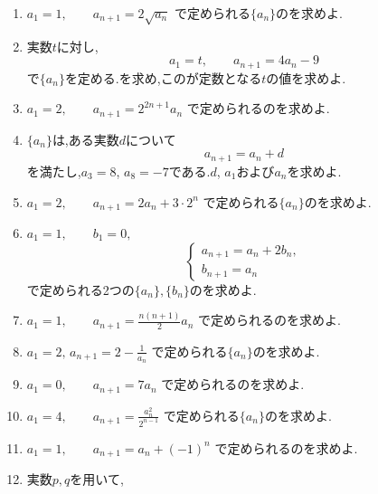\begin{enumerate}[label=\textbf{問\arabic*.},leftmargin=3.8em,format=\bookitemlink{practice-basic}{problem}{hint}]
\[\begin{cases}
        b_{n+1}=a_n+2b_n-1
      \end{cases}
    \]
    で定められる2つの$\{a_n\},\{b_n\}$のを求めよ.
  \item $a_1=1,\qquad a_{n+1}=2\sqrt{a_n}$
    で定められる$\{a_n\}$のを求めよ.
  \item 実数$t$に対し,
    \[
      a_1=t,\qquad a_{n+1}=4a_n-9
    \]
    で$\{a_n\}$を定める.を求め,このが定数となる$t$の値を求めよ.
  \item $a_1=2,\qquad a_{n+1}=2^{2n+1}a_n$
    で定められるのを求めよ.
  \item {}$\{a_n\}$は,ある実数$d$について
    \[
      a_{n+1}=a_n+d
    \]
    を満たし,$a_3=8$, $a_8=-7$である.$d$, $a_1$および$a_n$を求めよ.
  \item $a_1=2,\qquad a_{n+1}=2a_n+3\cdot2^n$
    で定められる$\{a_n\}$のを求めよ.
  \item $a_1=1,\qquad b_1=0,$
    \[
      \begin{cases}
        a_{n+1}=a_n+2b_n,\\
        b_{n+1}=a_n
      \end{cases}
    \]
    で定められる2つの$\{a_n\},\{b_n\}$のを求めよ.
  \item $a_1=1,\qquad a_{n+1}=\frac{n(n+1)}2a_n$
    で定められるのを求めよ.
  \item $a_1=2,\,a_{n+1}=2-\frac1{a_n}$
    で定められる$\{a_n\}$のを求めよ.
  \item $a_1=0,\qquad a_{n+1}=7a_n$
    で定められるのを求めよ.
  \item $a_1=4,\qquad a_{n+1}=\frac{a_n^2}{2^{n-1}}$
    で定められる$\{a_n\}$のを求めよ.
  \item $a_1=1,\qquad a_{n+1}=a_n+(-1)^n$
    で定められるのを求めよ.
  \item 実数$p,q$を用いて,

\end{enumerate}

